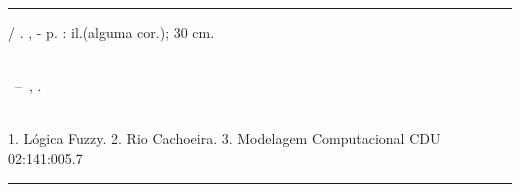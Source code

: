 \begin{fichacatalografica}
\vspace*{15cm} %
\hrule %
\begin{center} %
\begin{minipage}[c]{12.5cm} %
\imprimirautor
\hspace{0.5cm} \imprimirtitulo / \imprimirautor. 
\imprimirlocal, \imprimirdata-
\hspace{0.5cm} \pageref{LastPage} p. : il.(alguma cor.); 30 cm.\\
\hspace{0.5cm} \imprimirorientadorRotulo \; \imprimirorientador\\
\hspace{0.5cm}
\parbox[t]{\textwidth}{\imprimirtipotrabalho~--~\imprimirinstituicao,
\imprimirdata.}\\
\hspace{0.5cm}
1. Lógica Fuzzy.
2. Rio Cachoeira.
3. Modelagem Computacional
\hspace{8.75cm} CDU 02:141:005.7\\
\end{minipage}
\end{center}
\hrule
\end{fichacatalografica}
